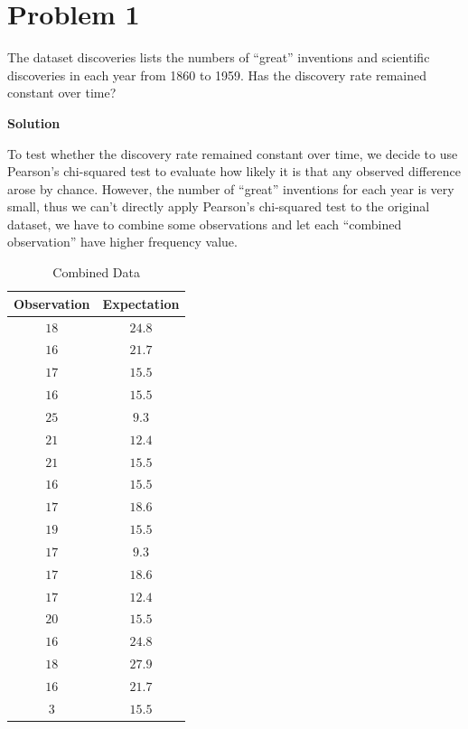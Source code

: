\documentclass[12pt,oneside,a4paper]{article}\usepackage[]{graphicx}\usepackage[]{xcolor}
\title{\hmwkTitle}
\author{\hmwkAuthorName}
\date{\today}
\newcommand{\problem}[1]
{
    \clearpage
    \section*{Problem {#1}}
}
\newcommand{\solution}
{
    \vspace{15pt}
    \noindent\ignorespaces\textbf{\large Solution}\par
}
\begin{document}
\maketitle



\problem{1}
The dataset discoveries lists the numbers of ``great'' inventions and scientific discoveries in each year from 1860 to 1959. Has the discovery rate remained constant over time?

\solution
To test whether the discovery rate remained constant over time, we decide to use Pearson's chi-squared test to evaluate how likely it is that any observed difference arose by chance. However, the number of ``great'' inventions for each year is very small, thus we can't directly apply Pearson's chi-squared test to the original dataset, we have to combine some observations and let each ``combined observation'' have higher frequency value.  

\begin{table}[ht!]
\centering
\caption{Combined Data}
\begin{tabular}{cc}
\toprule
 \multicolumn{1}{c}{ Observation } & \multicolumn{1}{c}{ Expectation } \\
\midrule
 $18$ & $24.8$ \\
 $16$ & $21.7$ \\
 $17$ & $15.5$ \\
 $16$ & $15.5$ \\
 $25$ & $9.3$ \\
 $21$ & $12.4$ \\
 $21$ & $15.5$ \\
 $16$ & $15.5$ \\
 $17$ & $18.6$ \\
 $19$ & $15.5$ \\
 $17$ & $9.3$ \\
 $17$ & $18.6$ \\
 $17$ & $12.4$ \\
 $20$ & $15.5$ \\
 $16$ & $24.8$ \\
 $18$ & $27.9$ \\
 $16$ & $21.7$ \\
 $3$ & $15.5$ \\
\bottomrule
\end{tabular}
\label{tab:combinedData}
\end{table}
\end{document}

